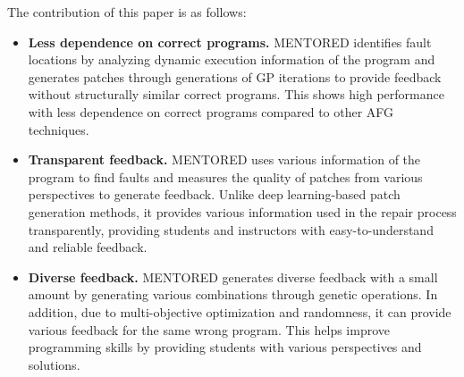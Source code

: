 \documentclass[10pt,conference]{IEEEtran}
\begin{document}
    The contribution of this paper is as follows:
    \begin{itemize}
        \item \textbf{Less dependence on correct programs.} MENTORED identifies fault locations by analyzing dynamic execution information of the program and generates patches through generations of GP iterations to provide feedback without structurally similar correct programs. This shows high performance with less dependence on correct programs compared to other AFG techniques.
        
        \item \textbf{Transparent feedback.} MENTORED uses various information of the program to find faults and measures the quality of patches from various perspectives to generate feedback. Unlike deep learning-based patch generation methods, it provides various information used in the repair process transparently, providing students and instructors with easy-to-understand and reliable feedback.
        
        \item \textbf{Diverse feedback.} MENTORED generates diverse feedback with a small amount by generating various combinations through genetic operations. In addition, due to multi-objective optimization and randomness, it can provide various feedback for the same wrong program. This helps improve programming skills by providing students with various perspectives and solutions.
    \end{itemize}
\end{document}
